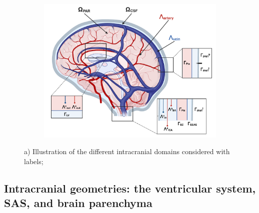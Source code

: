 \documentclass[fleqn,10pt]{wlscirep}
\begin{document}
\begin{figure}
     \begin{subfigure}[b]{0.45\textwidth}
         \centering
         \includegraphics[width=\textwidth]{figures/Brain-PVS-callouts.pdf}
     \end{subfigure}
     \hfill
     \caption{a) Illustration of the different intracranial domains
       considered with labels;}
     \label{fig:intracranial_domains}
\end{figure}

\subsection*{Intracranial geometries: the ventricular system, SAS, and brain parenchyma}


\end{document}
